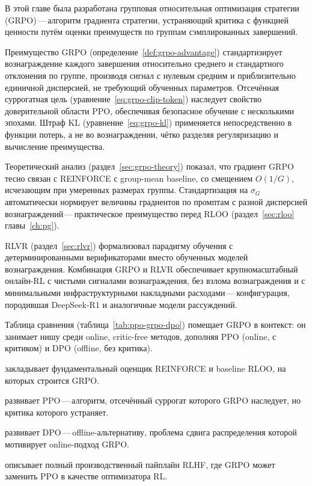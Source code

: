 В этой главе была разработана групповая относительная оптимизация стратегии (GRPO)\,---\,алгоритм градиента стратегии, устраняющий критика с функцией ценности путём оценки преимуществ по группам сэмплированных завершений.

Преимущество GRPO (определение~\ref{def:grpo-advantage}) стандартизирует вознаграждение каждого завершения относительно среднего и стандартного отклонения по группе, производя сигнал с нулевым средним и приблизительно единичной дисперсией, не требующий обученных параметров. Отсечённая суррогатная цель (уравнение~\eqref{eq:grpo-clip-token}) наследует свойство доверительной области PPO, обеспечивая безопасное обучение с несколькими эпохами. Штраф KL (уравнение~\eqref{eq:grpo-kl}) применяется непосредственно в функции потерь, а не во вознаграждении, чётко разделяя регуляризацию и вычисление преимущества.

Теоретический анализ (раздел~\ref{sec:grpo-theory}) показал, что градиент GRPO тесно связан с REINFORCE с group-mean baseline, со смещением $O(1/G)$, исчезающим при умеренных размерах группы. Стандартизация на $\sigma_G$ автоматически нормирует величины градиентов по промптам с разной дисперсией вознаграждений\,---\,практическое преимущество перед RLOO (раздел~\ref{sec:rloo} главы~\ref{ch:pg}).

RLVR (раздел~\ref{sec:rlvr}) формализовал парадигму обучения с детерминированными верификаторами вместо обученных моделей вознаграждения. Комбинация GRPO и RLVR обеспечивает крупномасштабный онлайн-RL с чистыми сигналами вознаграждения, без взлома вознаграждения и с минимальными инфраструктурными накладными расходами\,---\,конфигурация, породившая DeepSeek-R1 и аналогичные модели рассуждений.

Таблица сравнения (таблица~\ref{tab:ppo-grpo-dpo}) помещает GRPO в контекст: он занимает нишу среди online, critic-free методов, дополняя PPO (online, с критиком) и DPO (offline, без критика).

\begin{description}[leftmargin=!,labelwidth=3.5cm]
  \item[Глава~\ref{ch:pg}] закладывает фундаментальный оценщик REINFORCE и baseline RLOO, на которых строится GRPO.
  \item[Глава~\ref{ch:actor-critic}] развивает PPO\,---\,алгоритм, отсечённый суррогат которого GRPO наследует, но критика которого устраняет.
  \item[Глава~\ref{ch:dpo}] развивает DPO\,---\,offline-альтернативу, проблема сдвига распределения которой мотивирует online-подход GRPO.
  \item[Глава~\ref{ch:practical-rlhf}] описывает полный производственный пайплайн RLHF, где GRPO может заменить PPO в качестве оптимизатора RL.
\end{description}


